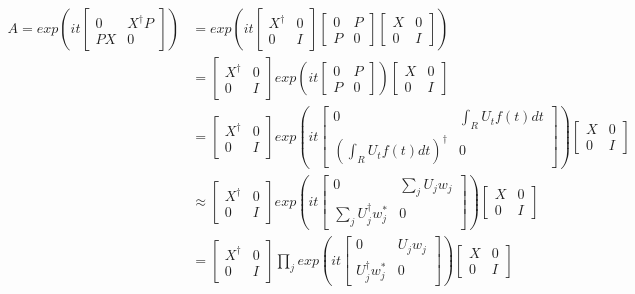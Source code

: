 \documentclass[10pt]{amsart}
\begin{document}
\begin{align}  
    A = exp(it \begin{bmatrix} 0 & X^{\dagger}P \\ PX & 0 \end{bmatrix} ) & = exp(it \begin{bmatrix} X^{\dagger} & 0 \\ 0 & I \end{bmatrix} \begin{bmatrix} 0 & P \\ P & 0 \end{bmatrix} \begin{bmatrix} X & 0 \\ 0 & I \end{bmatrix}) \\
    & = \begin{bmatrix} X^{\dagger} & 0 \\ 0 & I \end{bmatrix} exp(it \begin{bmatrix} 0 & P \\ P & 0 \end{bmatrix}) \begin{bmatrix} X & 0 \\ 0 & I \end{bmatrix} \\
    & = \begin{bmatrix} X^{\dagger} & 0 \\ 0 & I \end{bmatrix} exp( it \begin{bmatrix} 0 & \int_R U_t f(t)dt \\ (\int_R U_t f(t)dt)^{\dagger} & 0 \end{bmatrix}) \begin{bmatrix} X & 0 \\ 0 & I \end{bmatrix} \\
    & \approx \begin{bmatrix} X^{\dagger} & 0 \\ 0 & I \end{bmatrix} exp( it \begin{bmatrix} 0 & \sum_j U_j w_j \\ \sum_j U^{\dagger}_j w_j^* & 0 \end{bmatrix}) \begin{bmatrix} X & 0 \\ 0 & I \end{bmatrix} \\ 
    & = \begin{bmatrix} X^{\dagger} & 0 \\ 0 & I \end{bmatrix} \prod_j exp(it \begin{bmatrix} 0 &  U_j w_j \\  U^{\dagger}_j w_j^* & 0 \end{bmatrix}) \begin{bmatrix} X & 0 \\ 0 & I \end{bmatrix} \\

\end{align}
\end{document}
